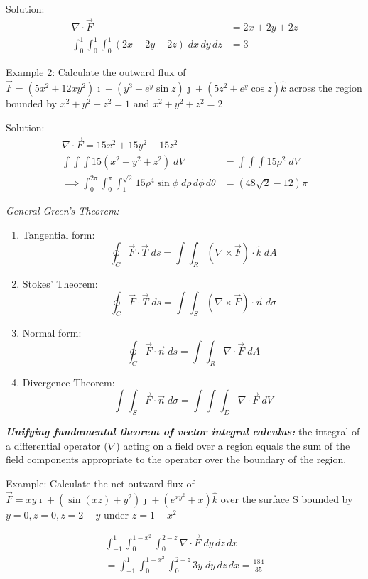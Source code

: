 \documentclass[12pt]{article}
\begin{document}
Solution:
\begin{align*}
    \nabla \cdot \vec{F} &= 2x + 2y + 2z\\
    \int_0^1 \int_0^1 \int_0^1 (2x + 2y + 2z) \; dx\, dy\, dz &= 3
\end{align*}

Example 2: Calculate the outward flux of $\vec{F} = (5x^2 + 12xy^2) \imath + (y^3 + e^y \sin z) \jmath + (5z^2 + e^y \cos z) \hat{k}$ across the region bounded by $x^2 + y^2 + z^2 =1$ and $x^2 + y^2 + z^2 = 2$

Solution:
\begin{align*}
    \nabla \cdot \vec{F} = 15x^2 + 15y^2 + 15z^2\\
    \int \int \int 15(x^2 + y^2 + z^2)\; dV &= \int \int \int 15 \rho^2 \; dV\\
    \implies \int_0^{2\pi} \int_0^{\pi} \int_1^{\sqrt{2}} 15 \rho^4 \sin \phi \; d\rho \, d\phi \, d\theta &= (48\sqrt{2} - 12) \pi 
\end{align*}

\emph{General Green's Theorem:}
\begin{enumerate}
    \item Tangential form:
    \[\oint_C \vec{F} \cdot \vec{T} \; ds = \int \int_R (\nabla \times \vec{F}) \cdot \hat{k} \; dA\]
    \item Stokes' Theorem:
    \[\oint_C \vec{F} \cdot \vec{T} \; ds = \int \int_S (\nabla \times \vec{F}) \cdot \vec{n} \; d\sigma\]
    \item Normal form:
    \[\oint_C \vec{F} \cdot \vec{n} \; ds = \int \int_R \nabla \cdot \vec{F} \; dA\]
    \item Divergence Theorem:
    \[\int \int_S \vec{F} \cdot \vec{n} \; d\sigma = \int \int \int_D \nabla \cdot \vec{F} \; dV\]
\end{enumerate}

\emph{\textbf{Unifying fundamental theorem of vector integral calculus:}} the integral of a differential operator ($\nabla$) acting on a field over a region equals the sum of the field components appropriate to the operator over the boundary of the region.

Example: Calculate the net outward flux of $\vec{F} = xy \imath + (\sin(xz) + y^2) \jmath + (e^{xy^2} + x) \hat{k}$ over the surface S bounded by $y=0, z=0, z=2-y$ under $z=1-x^2$

\begin{align*}
    \int_{-1}^1 \int_0^{1-x^2} \int_0^{2-z} \nabla \cdot \vec{F} \; dy\, dz\, dx\\
    = \int_{-1}^1 \int_0^{1-x^2} \int_0^{2-z} 3y\; dy\, dz\, dx = \frac{184}{35}
\end{align*}
\end{document}
